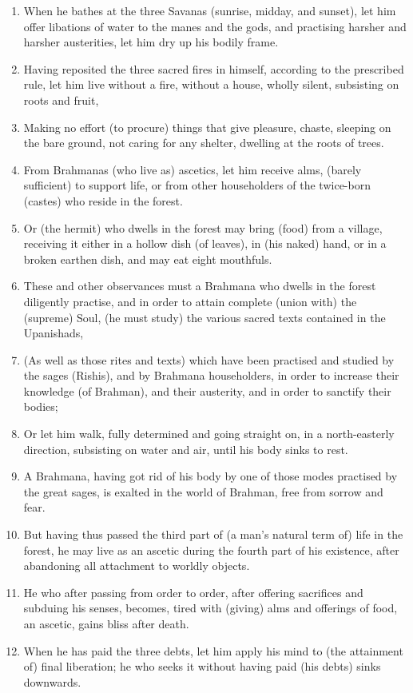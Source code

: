 \begin{enumerate}
\item When he bathes at the three Savanas (sunrise, midday, and sunset), let him offer libations of water to the manes and the gods, and practising harsher and harsher austerities, let him dry up his bodily frame.
\item Having reposited the three sacred fires in himself, according to the prescribed rule, let him live without a fire, without a house, wholly silent, subsisting on roots and fruit,
\item Making no effort (to procure) things that give pleasure, chaste, sleeping on the bare ground, not caring for any shelter, dwelling at the roots of trees.
\item From Brahmanas (who live as) ascetics, let him receive alms, (barely sufficient) to support life, or from other householders of the twice-born (castes) who reside in the forest.
\item Or (the hermit) who dwells in the forest may bring (food) from a village, receiving it either in a hollow dish (of leaves), in (his naked) hand, or in a broken earthen dish, and may eat eight mouthfuls.
\item These and other observances must a Brahmana who dwells in the forest diligently practise, and in order to attain complete (union with) the (supreme) Soul, (he must study) the various sacred texts contained in the Upanishads,
\item (As well as those rites and texts) which have been practised and studied by the sages (Rishis), and by Brahmana householders, in order to increase their knowledge (of Brahman), and their austerity, and in order to sanctify their bodies;
\item Or let him walk, fully determined and going straight on, in a north-easterly direction, subsisting on water and air, until his body sinks to rest.
\item A Brahmana, having got rid of his body by one of those modes practised by the great sages, is exalted in the world of Brahman, free from sorrow and fear.
\item But having thus passed the third part of (a man's natural term of) life in the forest, he may live as an ascetic during the fourth part of his existence, after abandoning all attachment to worldly objects.
\item He who after passing from order to order, after offering sacrifices and subduing his senses, becomes, tired with (giving) alms and offerings of food, an ascetic, gains bliss after death.
\item When he has paid the three debts, let him apply his mind to (the attainment of) final liberation; he who seeks it without having paid (his debts) sinks downwards.

\end{enumerate}

